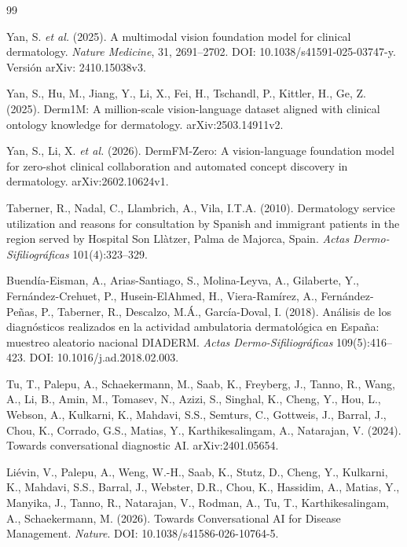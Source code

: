 
\begin{thebibliography}{99}

Yan, S. \emph{et al.} (2025). A multimodal vision foundation model for clinical dermatology. \emph{Nature Medicine}, 31, 2691--2702. DOI: 10.1038/s41591-025-03747-y. Versión arXiv: 2410.15038v3.

Yan, S., Hu, M., Jiang, Y., Li, X., Fei, H., Tschandl, P., Kittler, H., Ge, Z. (2025). Derm1M: A million-scale vision-language dataset aligned with clinical ontology knowledge for dermatology. arXiv:2503.14911v2.

Yan, S., Li, X. \emph{et al.} (2026). DermFM-Zero: A vision-language foundation model for zero-shot clinical collaboration and automated concept discovery in dermatology. arXiv:2602.10624v1.

Taberner, R., Nadal, C., Llambrich, A., Vila, I.T.A. (2010). Dermatology service utilization and reasons for consultation by Spanish and immigrant patients in the region served by Hospital Son Llàtzer, Palma de Majorca, Spain. \emph{Actas Dermo-Sifiliográficas} 101(4):323--329.

Buendía-Eisman, A., Arias-Santiago, S., Molina-Leyva, A., Gilaberte, Y., Fernández-Crehuet, P., Husein-ElAhmed, H., Viera-Ramírez, A., Fernández-Peñas, P., Taberner, R., Descalzo, M.Á., García-Doval, I. (2018). Análisis de los diagnósticos realizados en la actividad ambulatoria dermatológica en España: muestreo aleatorio nacional DIADERM. \emph{Actas Dermo-Sifiliográficas} 109(5):416--423. DOI: 10.1016/j.ad.2018.02.003.

Tu, T., Palepu, A., Schaekermann, M., Saab, K., Freyberg, J., Tanno, R., Wang, A., Li, B., Amin, M., Tomasev, N., Azizi, S., Singhal, K., Cheng, Y., Hou, L., Webson, A., Kulkarni, K., Mahdavi, S.S., Semturs, C., Gottweis, J., Barral, J., Chou, K., Corrado, G.S., Matias, Y., Karthikesalingam, A., Natarajan, V. (2024). Towards conversational diagnostic AI. arXiv:2401.05654.

Liévin, V., Palepu, A., Weng, W.-H., Saab, K., Stutz, D., Cheng, Y., Kulkarni, K., Mahdavi, S.S., Barral, J., Webster, D.R., Chou, K., Hassidim, A., Matias, Y., Manyika, J., Tanno, R., Natarajan, V., Rodman, A., Tu, T., Karthikesalingam, A., Schaekermann, M. (2026). Towards Conversational AI for Disease Management. \emph{Nature}. DOI: 10.1038/s41586-026-10764-5.


\end{thebibliography}
